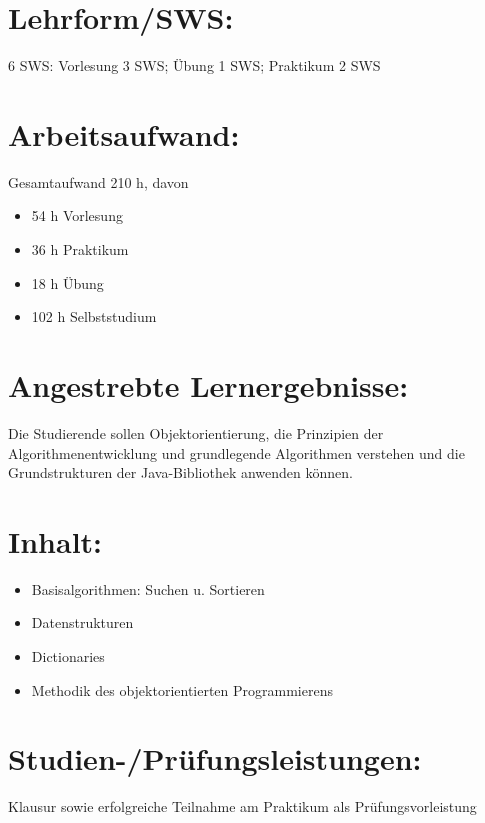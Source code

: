 \section*{Lehrform/SWS:}\label{lehrformsws-1}

6 SWS: Vorlesung 3 SWS; Übung 1 SWS; Praktikum 2 SWS

\section*{Arbeitsaufwand:}\label{arbeitsaufwand-1}

Gesamtaufwand 210 h, davon

\begin{itemize}
\item
  54 h Vorlesung
\item
  36 h Praktikum
\item
  18 h Übung
\item
  102 h Selbststudium
\end{itemize}

\section*{Angestrebte
Lernergebnisse:}\label{angestrebte-lernergebnisse-1}

Die Studierende sollen Objektorientierung, die Prinzipien der
Algorithmenentwicklung und grundlegende Algorithmen verstehen und die
Grundstrukturen der Java-Bibliothek anwenden können.

\section*{Inhalt:}\label{inhalt-1}

\begin{itemize}
\item
  Basisalgorithmen: Suchen u. Sortieren
\item
  Datenstrukturen
\item
  Dictionaries
\item
  Methodik des objektorientierten Programmierens
\end{itemize}

\section*{Studien-/Prüfungsleistungen:}\label{studien-pruxfcfungsleistungen-1}

Klausur sowie erfolgreiche Teilnahme am Praktikum als
Prüfungsvorleistung

